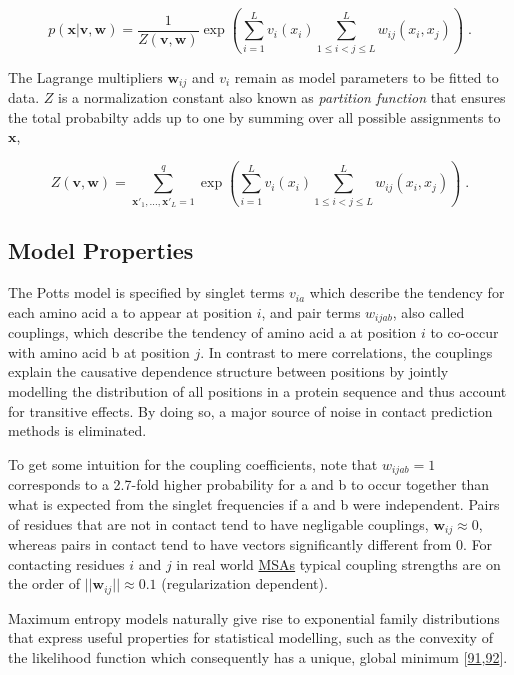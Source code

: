 \documentclass[11pt,a4paper,twoside]{book}
\newcommand{\seq}{\mathbf{x}}
\renewcommand{\v}{\mathbf{v}}
\newcommand{\vi}{v_{i}}
\newcommand{\via}{v_{ia}}
\newcommand{\w}{\mathbf{w}}
\newcommand{\wij}{\mathbf{w}_{ij}}
\newcommand{\wijab}{w_{ijab}}
\theoremstyle{definition}
\theoremstyle{definition}
\theoremstyle{remark}
\begin{document}
\begin{equation}
    p(\seq | \v, \w ) = \frac{1}{Z(\v, \w)} \exp \left( \sum_{i=1}^L v_i(x_i) \sum_{1 \leq i < j \leq L}^L w_{ij}(x_i, x_j) \right) \; .
\label{eq:max-ent-model}
\end{equation}

The Lagrange multipliers \(\wij\) and \(\vi\) remain as model parameters
to be fitted to data. \(Z\) is a normalization constant also known as
\emph{partition function} that ensures the total probabilty adds up to
one by summing over all possible assignments to \(\seq\),

\begin{equation}
  Z(\v, \w) = \sum_{\seq\prime_1, \ldots, \seq\prime_L = 1}^{q} \exp  \left( \sum_{i=1}^L v_i(x_i) \sum_{1 \leq i < j \leq L}^L w_{ij}(x_i, x_j) \right) \; .
  \label{eq:partition-fct-likelihood}
\end{equation}

\subsection{Model Properties}\label{potts-model-properties}

The Potts model is specified by singlet terms \(\via\) which describe
the tendency for each amino acid a to appear at position \(i\), and pair
terms \(\wijab\), also called couplings, which describe the tendency of
amino acid a at position \(i\) to co-occur with amino acid b at position
\(j\). In contrast to mere correlations, the couplings explain the
causative dependence structure between positions by jointly modelling
the distribution of all positions in a protein sequence and thus account
for transitive effects. By doing so, a major source of noise in contact
prediction methods is eliminated.

To get some intuition for the coupling coefficients, note that
\(\wijab = 1\) corresponds to a 2.7-fold higher probability for a and b
to occur together than what is expected from the singlet frequencies if
a and b were independent. Pairs of residues that are not in contact tend
to have negligable couplings, \(\wij \approx 0\), whereas pairs in
contact tend to have vectors significantly different from 0. For
contacting residues \(i\) and \(j\) in real world
\protect\hyperlink{abbrev}{MSAs} typical coupling strengths are on the
order of \(||\wij || \approx 0.1\) (regularization dependent).

Maximum entropy models naturally give rise to exponential family
distributions that express useful properties for statistical modelling,
such as the convexity of the likelihood function which consequently has
a unique, global minimum
{[}\protect\hyperlink{ref-Wainwright2007}{91},\protect\hyperlink{ref-Murphy2012}{92}{]}.
\end{document}
